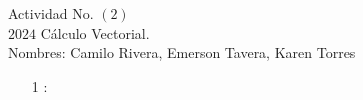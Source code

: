 \documentclass[13pt]{memoir}
\begin{document}
\begin{center}
			\centering
			Actividad No. $(2)$\\
			$2024$ Cálculo Vectorial.\\
			Nombres:  Camilo Rivera, Emerson Tavera, Karen Torres
\end{center}

\begin{enumerate}

\item[ 1]: 

\end{enumerate}	
\end{document}
